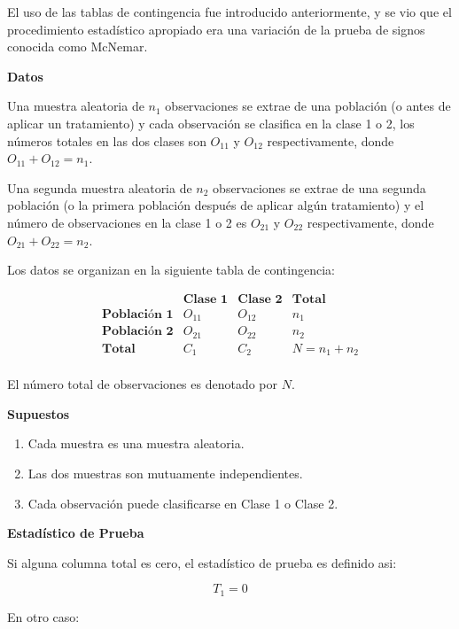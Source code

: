 \documentclass[a4paper,oneside,openany]{book}
\begin{document}
El uso de las tablas de contingencia fue introducido anteriormente, y se
vio que el procedimiento estadístico apropiado era una variación de la
prueba de signos conocida como McNemar.

\textbf{Datos}

Una muestra aleatoria de \(n_{1}\) observaciones se extrae de una
población (o antes de aplicar un tratamiento) y cada observación se
clasifica en la clase 1 o 2, los números totales en las dos clases son
\(O_{11}\) y \(O_{12}\) respectivamente, donde
\(O_{11} + O_{12}= n_{1}\).

Una segunda muestra aleatoria de \(n_{2}\) observaciones se extrae de
una segunda población (o la primera población después de aplicar algún
tratamiento) y el número de observaciones en la clase 1 o 2 es
\(O_{21}\) y \(O_{22}\) respectivamente, donde \(O_{21} +O_{22}=n_{2}\).

Los datos se organizan en la siguiente tabla de contingencia:

\[
\begin{equation*}
\begin{array}{c|c|c|c}
 & \textbf{Clase 1} & \textbf{Clase 2} & \textbf{Total}     \\
\hline
\textbf{Población 1} & O_{11} & O_{12} & n_{1}   \\
\hline
\textbf{Población 2} & O_{21} & O_{22} & n_{2}\\
\hline
\textbf{Total}       & C_{1} & C_{2}   & N=n_{1}+n_{2} \\
\end{array}
\end{equation*}
\]

El número total de observaciones es denotado por \(N\).

\textbf{Supuestos}

\begin{enumerate}
\def\labelenumi{\arabic{enumi})}
\item
  Cada muestra es una muestra aleatoria.
\item
  Las dos muestras son mutuamente independientes.
\item
  Cada observación puede clasificarse en Clase 1 o Clase 2.
\end{enumerate}

\textbf{Estadístico de Prueba}

Si alguna columna total es cero, el estadístico de prueba es definido
asi:

\[T_{1}=0\]

En otro caso:
\end{document}
